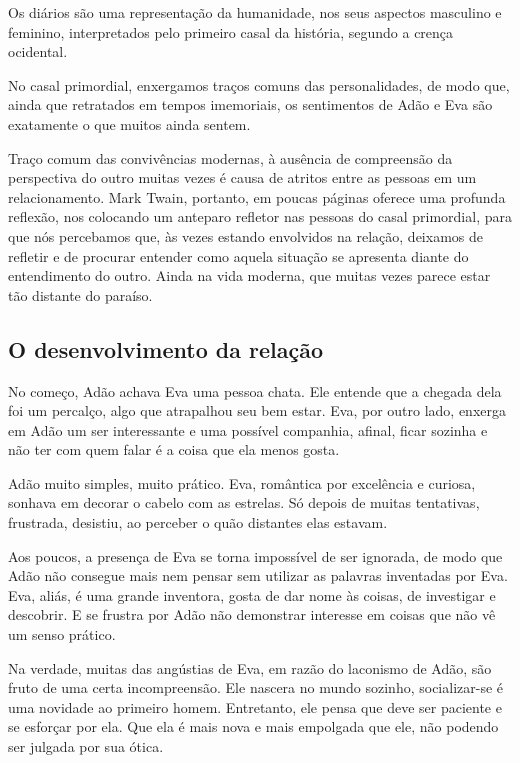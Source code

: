 \documentclass{extarticle}
\begin{document}
Os diários são uma representação da humanidade, nos seus aspectos
masculino e feminino, interpretados pelo primeiro casal da história,
segundo a crença ocidental.

No casal primordial, enxergamos traços comuns das personalidades, de
modo que, ainda que retratados em tempos imemoriais, os sentimentos de
Adão e Eva são exatamente o que muitos ainda sentem.

Traço comum das convivências modernas, à ausência de compreensão da
perspectiva do outro muitas vezes é causa de atritos entre as pessoas em
um relacionamento. Mark Twain, portanto, em poucas páginas oferece uma
profunda reflexão, nos colocando um anteparo refletor nas pessoas do
casal primordial, para que nós percebamos que, às vezes estando
envolvidos na relação, deixamos de refletir e de procurar entender como
aquela situação se apresenta diante do entendimento do outro. Ainda na
vida moderna, que muitas vezes parece estar tão distante do paraíso.

\subsection{O desenvolvimento da relação}

No começo, Adão achava Eva uma pessoa chata. Ele entende que a chegada
dela foi um percalço, algo que atrapalhou seu bem estar. Eva, por outro
lado, enxerga em Adão um ser interessante e uma possível companhia,
afinal, ficar sozinha e não ter com quem falar é a coisa que ela menos
gosta.

Adão muito simples, muito prático. Eva, romântica por excelência e
curiosa, sonhava em decorar o cabelo com as estrelas. Só depois de
muitas tentativas, frustrada, desistiu, ao perceber o quão distantes
elas estavam.

Aos poucos, a presença de Eva se torna impossível de ser ignorada, de
modo que Adão não consegue mais nem pensar sem utilizar as palavras
inventadas por Eva. Eva, aliás, é uma grande inventora, gosta de dar
nome às coisas, de investigar e descobrir. E se frustra por Adão não
demonstrar interesse em coisas que não vê um senso prático.

Na verdade, muitas das angústias de Eva, em razão do laconismo de Adão,
são fruto de uma certa incompreensão. Ele nascera no mundo sozinho,
socializar-se é uma novidade ao primeiro homem. Entretanto, ele pensa
que deve ser paciente e se esforçar por ela. Que ela é mais nova e mais
empolgada que ele, não podendo ser julgada por sua ótica.
\end{document}
